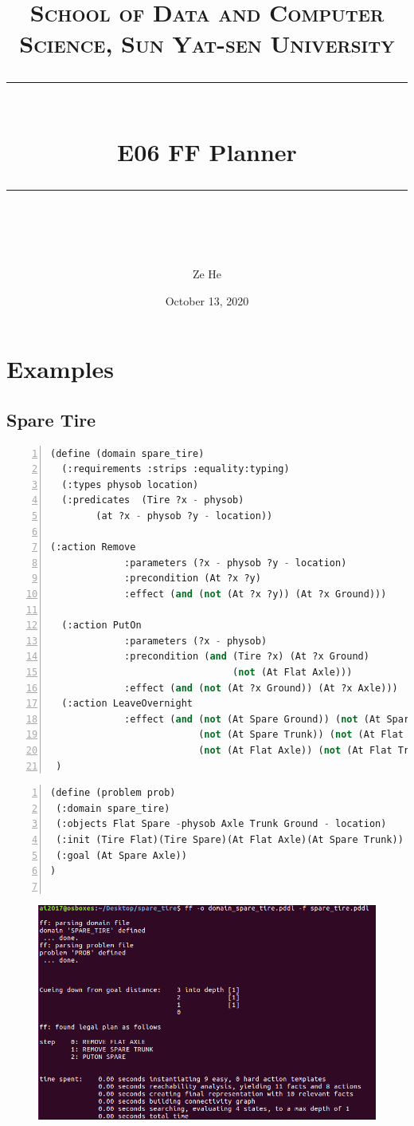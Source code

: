 \documentclass[a4paper, 11pt]{article}
\title{	
\normalfont \normalsize
\textsc{School of Data and Computer Science, Sun Yat-sen University} \\ [25pt] %
\rule{\textwidth}{0.5pt} \\[0.4cm] %
\huge  E06 FF Planner \\ %
\rule{\textwidth}{2pt} \\[0.5cm] %
\author{Ze He}
\date{\normalsize October 13, 2020}
}
\begin{document}
\maketitle
\tableofcontents
\newpage

\section{Examples}

\subsection{Spare Tire}
\label{sec:spare-tire}

\begin{lstlisting}[title=domain\_spare\_tire.pddl,frame=single,language=lisp,numbers=left]
(define (domain spare_tire)
  (:requirements :strips :equality:typing)
  (:types physob location) 
  (:predicates  (Tire ?x - physob)
		(at ?x - physob ?y - location))

(:action Remove
             :parameters (?x - physob ?y - location)
             :precondition (At ?x ?y)
             :effect (and (not (At ?x ?y)) (At ?x Ground)))

  (:action PutOn
             :parameters (?x - physob)
             :precondition (and (Tire ?x) (At ?x Ground) 
                                (not (At Flat Axle)))
             :effect (and (not (At ?x Ground)) (At ?x Axle)))
  (:action LeaveOvernight
             :effect (and (not (At Spare Ground)) (not (At Spare Axle)) 
                          (not (At Spare Trunk)) (not (At Flat Ground)) 
                          (not (At Flat Axle)) (not (At Flat Trunk)) ))
 )

\end{lstlisting}
\begin{lstlisting}[title=spare\_tire.pddl,frame=single,language=lisp,numbers=left]
(define (problem prob)
 (:domain spare_tire)
 (:objects Flat Spare -physob Axle Trunk Ground - location)
 (:init (Tire Flat)(Tire Spare)(At Flat Axle)(At Spare Trunk))
 (:goal (At Spare Axle))
)


\end{lstlisting}
\begin{figure}[h]
  \centering
  \includegraphics[width=16cm]{Pic/spare_tire}
\end{figure}
\end{document}
